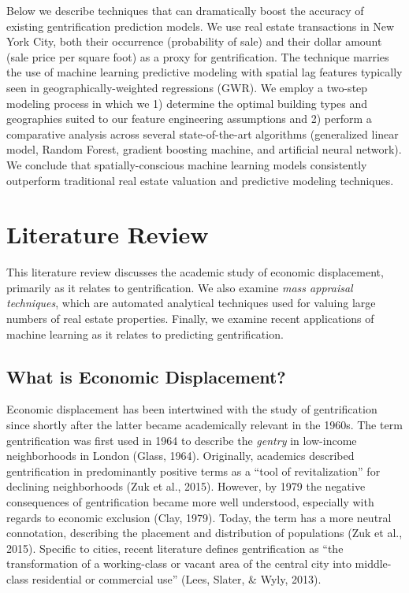 \documentclass[12pt,]{article}
\begin{document}
Below we describe techniques that can dramatically boost the accuracy of
existing gentrification prediction models. We use real estate
transactions in New York City, both their occurrence (probability of
sale) and their dollar amount (sale price per square foot) as a proxy
for gentrification. The technique marries the use of machine learning
predictive modeling with spatial lag features typically seen in
geographically-weighted regressions (GWR). We employ a two-step modeling
process in which we 1) determine the optimal building types and
geographies suited to our feature engineering assumptions and 2) perform
a comparative analysis across several state-of-the-art algorithms
(generalized linear model, Random Forest, gradient boosting machine, and
artificial neural network). We conclude that spatially-conscious machine
learning models consistently outperform traditional real estate
valuation and predictive modeling techniques.

\hypertarget{literature-review}{%
\section{Literature Review}\label{literature-review}}

This literature review discusses the academic study of economic
displacement, primarily as it relates to gentrification. We also examine
\emph{mass appraisal techniques}, which are automated analytical
techniques used for valuing large numbers of real estate properties.
Finally, we examine recent applications of machine learning as it
relates to predicting gentrification.

\hypertarget{what-is-economic-displacement}{%
\subsection{What is Economic
Displacement?}\label{what-is-economic-displacement}}

Economic displacement has been intertwined with the study of
gentrification since shortly after the latter became academically
relevant in the 1960s. The term gentrification was first used in 1964 to
describe the \emph{gentry} in low-income neighborhoods in London (Glass,
1964). Originally, academics described gentrification in predominantly
positive terms as a ``tool of revitalization'' for declining
neighborhoods (Zuk et al., 2015). However, by 1979 the negative
consequences of gentrification became more well understood, especially
with regards to economic exclusion (Clay, 1979). Today, the term has a
more neutral connotation, describing the placement and distribution of
populations (Zuk et al., 2015). Specific to cities, recent literature
defines gentrification as ``the transformation of a working-class or
vacant area of the central city into middle-class residential or
commercial use'' (Lees, Slater, \& Wyly, 2013).
\end{document}
